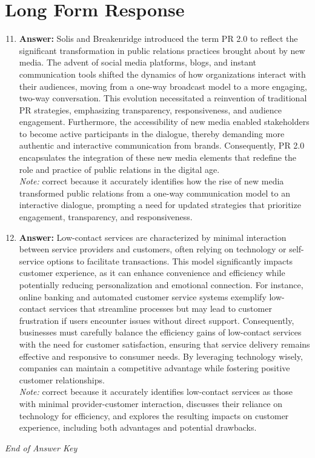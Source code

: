 \documentclass[12pt]{article}
\begin{document}
\section*{Long Form Response}
\begin{enumerate}[label=\arabic*.]
\setcounter{enumi}{10}
\item \textbf{Answer:} Solis and Breakenridge introduced the term PR 2.0 to reflect the significant transformation in public relations practices brought about by new media. The advent of social media platforms, blogs, and instant communication tools shifted the dynamics of how organizations interact with their audiences, moving from a one-way broadcast model to a more engaging, two-way conversation. This evolution necessitated a reinvention of traditional PR strategies, emphasizing transparency, responsiveness, and audience engagement. Furthermore, the accessibility of new media enabled stakeholders to become active participants in the dialogue, thereby demanding more authentic and interactive communication from brands. Consequently, PR 2.0 encapsulates the integration of these new media elements that redefine the role and practice of public relations in the digital age.
\\ \textit{Note:} correct because it accurately identifies how the rise of new media transformed public relations from a one-way communication model to an interactive dialogue, prompting a need for updated strategies that prioritize engagement, transparency, and responsiveness.
\item \textbf{Answer:} Low-contact services are characterized by minimal interaction between service providers and customers, often relying on technology or self-service options to facilitate transactions. This model significantly impacts customer experience, as it can enhance convenience and efficiency while potentially reducing personalization and emotional connection. For instance, online banking and automated customer service systems exemplify low-contact services that streamline processes but may lead to customer frustration if users encounter issues without direct support. Consequently, businesses must carefully balance the efficiency gains of low-contact services with the need for customer satisfaction, ensuring that service delivery remains effective and responsive to consumer needs. By leveraging technology wisely, companies can maintain a competitive advantage while fostering positive customer relationships.
\\ \textit{Note:} correct because it accurately identifies low-contact services as those with minimal provider-customer interaction, discusses their reliance on technology for efficiency, and explores the resulting impacts on customer experience, including both advantages and potential drawbacks.
\end{enumerate}

\vfill
\noindent\textit{End of Answer Key}
\end{document}
